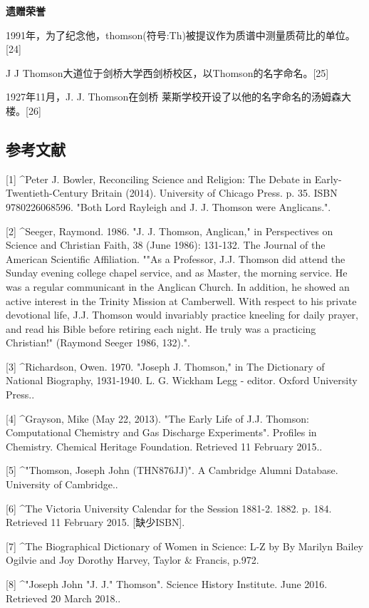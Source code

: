 \textbf{遗赠荣誉}

1991年，为了纪念他，thomson(符号:Th)被提议作为质谱中测量质荷比的单位。[24]

J J Thomson大道位于剑桥大学西剑桥校区，以Thomson的名字命名。[25]

1927年11月，J. J. Thomson在剑桥 莱斯学校开设了以他的名字命名的汤姆森大楼。[26]

\subsection{参考文献}
[1]
^Peter J. Bowler, Reconciling Science and Religion: The Debate in Early-Twentieth-Century Britain (2014). University of Chicago Press. p. 35. ISBN 9780226068596. "Both Lord Rayleigh and J. J. Thomson were Anglicans.".

[2]
^Seeger, Raymond. 1986. "J. J. Thomson, Anglican," in Perspectives on Science and Christian Faith, 38 (June 1986): 131-132. The Journal of the American Scientific Affiliation. ""As a Professor, J.J. Thomson did attend the Sunday evening college chapel service, and as Master, the morning service. He was a regular communicant in the Anglican Church. In addition, he showed an active interest in the Trinity Mission at Camberwell. With respect to his private devotional life, J.J. Thomson would invariably practice kneeling for daily prayer, and read his Bible before retiring each night. He truly was a practicing Christian!" (Raymond Seeger 1986, 132).".

[3]
^Richardson, Owen. 1970. "Joseph J. Thomson," in The Dictionary of National Biography, 1931-1940. L. G. Wickham Legg - editor. Oxford University Press..

[4]
^Grayson, Mike (May 22, 2013). "The Early Life of J.J. Thomson: Computational Chemistry and Gas Discharge Experiments". Profiles in Chemistry. Chemical Heritage Foundation. Retrieved 11 February 2015..

[5]
^"Thomson, Joseph John (THN876JJ)". A Cambridge Alumni Database. University of Cambridge..

[6]
^The Victoria University Calendar for the Session 1881-2. 1882. p. 184. Retrieved 11 February 2015. [缺少ISBN].

[7]
^The Biographical Dictionary of Women in Science: L-Z by By Marilyn Bailey Ogilvie and Joy Dorothy Harvey, Taylor & Francis, p.972.

[8]
^"Joseph John "J. J." Thomson". Science History Institute. June 2016. Retrieved 20 March 2018..

